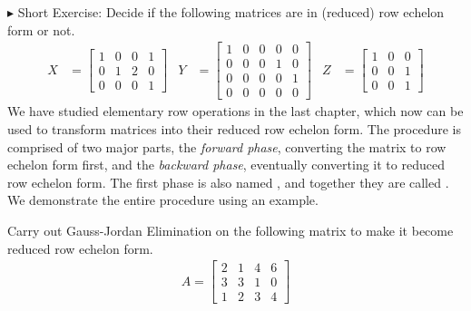 $\blacktriangleright$ Short Exercise: Decide if the following matrices are in (reduced) row echelon form or not.\footnotemark
\begin{align*}
X &= 
\begin{bmatrix}
1 & 0 & 0 & 1 \\
0 & 1 & 2 & 0 \\
0 & 0 & 0 & 1
\end{bmatrix}
& Y&=
\begin{bmatrix}
1 & 0 & 0 & 0 & 0 \\
0 & 0 & 0 & 1 & 0 \\
0 & 0 & 0 & 0 & 1 \\
0 & 0 & 0 & 0 & 0
\end{bmatrix}
& Z&=
\begin{bmatrix}
1 & 0 & 0 \\
0 & 0 & 1 \\
0 & 0 & 1 
\end{bmatrix}
\end{align*}
We have studied elementary row operations in the last chapter, which now can be used to transform matrices into their reduced row echelon form. The procedure is comprised of two major parts, the \textit{forward phase}, converting the matrix to row echelon form first, and the \textit{backward phase}, eventually converting it to reduced row echelon form. The first phase is also named , and together they are called \footnotemark. We demonstrate the entire procedure using an example.
\begin{exmp}
Carry out Gauss-Jordan Elimination on the following matrix to make it become reduced row echelon form.
\begin{align*}
A =
\begin{bmatrix}
2 & 1 & 4 & 6 \\
3 & 3 & 1 & 0 \\
1 & 2 & 3 & 4
\end{bmatrix}    
\end{align*}
\end{exmp}
